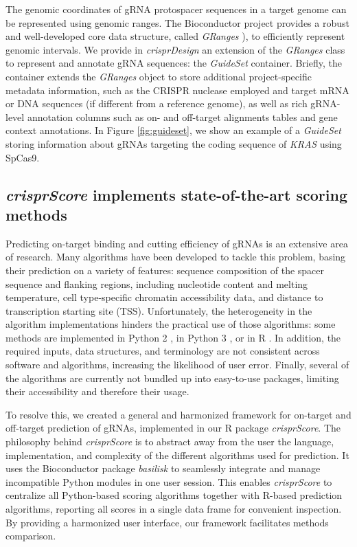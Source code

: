 \documentclass[pdftex,english,10pt]{article}
\begin{document}
The genomic coordinates of gRNA protospacer sequences in a target genome can be represented using genomic ranges.
The Bioconductor project \citep{bioc1,bioc2} provides a robust and well-developed core data structure, called \textit{GRanges} \citep{genomicranges,granges}), to efficiently represent genomic intervals. We provide in \textit{crisprDesign} an extension of the \textit{GRanges} class to represent and annotate gRNA sequences: the \textit{GuideSet} container. Briefly, the container extends the \textit{GRanges} object to store additional project-specific metadata information, such as the CRISPR nuclease employed and target mRNA or DNA sequences (if different from a reference genome), as well as rich gRNA-level annotation columns such as on- and off-target alignments tables and gene context annotations. In Figure \ref{fig:guideset},  we show an example of a \textit{GuideSet} storing information about gRNAs targeting the coding sequence of \textit{KRAS} using SpCas9. 




\subsection*{\textit{crisprScore} implements state-of-the-art scoring methods}

Predicting on-target binding and cutting efficiency of gRNAs is an extensive area of research. Many algorithms have been developed to tackle this problem, basing their prediction on a variety of features: sequence composition of the spacer sequence and flanking regions, including nucleotide content and melting temperature, cell type-specific chromatin accessibility data, and distance to transcription starting site (TSS).  Unfortunately, the heterogeneity in the algorithm implementations hinders the practical use of those algorithms: some methods are implemented in Python 2 \citep{azimuth,deepcpf1,crispria, deepspcas9}, in Python 3 \citep{lindel,deepcas9,enpamgb}, or in R  \citep{doench2014rational,wessels2020massively,crisprscan,crisprater}. In addition, the required inputs, data structures, and terminology are not consistent across software and algorithms, increasing the likelihood of user error. Finally, several of the algorithms are currently not bundled up into easy-to-use packages, limiting their accessibility and therefore their usage.

To resolve this, we created a general and harmonized framework for on-target and off-target prediction of gRNAs, implemented in our R package \textit{crisprScore}. The philosophy behind \textit{crisprScore} is to abstract away from the user the language, implementation, and complexity of the different algorithms used for prediction.  It uses the Bioconductor package \textit{basilisk} \citep{basilisk} to seamlessly integrate and manage incompatible Python modules in one user session. This enables \textit{crisprScore} to centralize all Python-based scoring algorithms together with R-based prediction algorithms, reporting all scores in a single data frame for convenient inspection. By providing a harmonized user interface, our framework facilitates methods comparison. 
\end{document}
